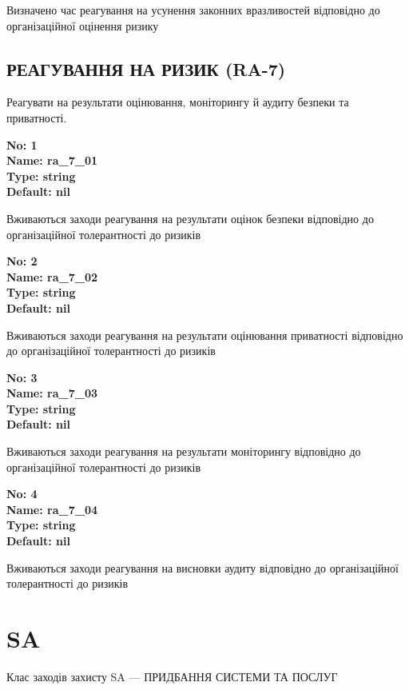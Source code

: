 \documentclass{article}
\begin{document}
{\footnotesize Визначено час реагування на усунення законних вразливостей відповідно до організаційної оцінення ризику}




\subsection{РЕАГУВАННЯ НА РИЗИК (RA-7)}
Реагувати на результати оцінювання, моніторингу й аудиту безпеки та приватності.

\vspace{10pt}
{\footnotesize\bfseries
No: 1\\
Name: ra\_\allowbreak{}7\_\allowbreak{}01\\
Type: string\\
Default: nil
}

{\footnotesize Вживаються заходи реагування на результати оцінок безпеки відповідно до організаційної толерантності до ризиків}


{\footnotesize\bfseries
No: 2\\
Name: ra\_\allowbreak{}7\_\allowbreak{}02\\
Type: string\\
Default: nil
}

{\footnotesize Вживаються заходи реагування на результати оцінювання приватності відповідно до організаційної толерантності до ризиків}


{\footnotesize\bfseries
No: 3\\
Name: ra\_\allowbreak{}7\_\allowbreak{}03\\
Type: string\\
Default: nil
}

{\footnotesize Вживаються заходи реагування на результати моніторингу відповідно до організаційної толерантності до ризиків}


{\footnotesize\bfseries
No: 4\\
Name: ra\_\allowbreak{}7\_\allowbreak{}04\\
Type: string\\
Default: nil
}

{\footnotesize Вживаються заходи реагування на висновки аудиту відповідно до організаційної толерантності до ризиків}




\section{SA}
Клас заходів захисту SA --- ПРИДБАННЯ СИСТЕМИ ТА ПОСЛУГ
\end{document}
